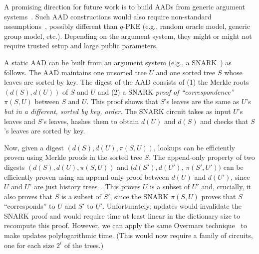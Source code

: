 %
%
%
A promising direction for future work is to build AADs from generic argument systems~\cite{groth10,groth16,qsp,cs-proofs,aurora,bulletproofs,ligero,hyrax,stark}.
Such AAD constructions would also require non-standard assumptions~\cite{GentryWichs2011}, possibly different than $q$-PKE (e.g., random oracle model, generic group model, etc.).
Depending on the argument system, they might or might not require trusted setup and large public parameters.

A static AAD can be built from an argument system (e.g., a SNARK~\cite{groth16,qsp}) as follows.
The AAD maintains one unsorted tree $U$ and one sorted tree $S$ whose leaves are sorted by key. 
The digest of the AAD consists of (1) the Merkle roots $(d(S), d(U))$ of $S$ and $U$ and (2) a SNARK \textit{proof of ``correspondence''} $\pi(S,U)$  between $S$ and $U$.
This proof shows that $S$'s leaves are the same as $U$'s \textit{but in a different, sorted by key, order}.
The SNARK circuit takes as input $U$'s leaves and $S$'s leaves, hashes them to obtain $d(U)$ and $d(S)$ and checks that $S$'s leaves are sorted by key.

Now, given a digest $(d(S), d(U), \pi(S,U))$, lookups can be efficiently proven using Merkle proofs in the sorted tree $S$.
The append-only property of two digests $(d(S), d(U), \pi(S,U))$ and $(d(S'), d(U')$, $\pi(S',U'))$ can be efficiently proven using an append-only proof between $d(U)$ and $d(U')$, since $U$ and $U'$ are just history trees~\cite{ht}.
This proves $U$ is a subset of $U'$ and, crucially, it also proves that $S$ is a subset of $S'$, since the SNARK $\pi(S,U)$ proves that $S$ ``corresponds'' to $U$ and $S'$ to $U'$.
Unfortunately, updates would invalidate the SNARK proof and would require time at least linear in the dictionary size to recompute this proof.
However, we can apply the same Overmars technique~\cite{overmars,overmars-van-leeuwen} to make updates polylogarithmic time.
(This would now require a family of circuits, one for each size $2^i$ of the trees.)

